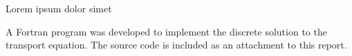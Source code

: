 \documentclass[../main.tex]{subfiles}
\begin{document}
Lorem ipsum dolor simet

A Fortran program was developed to implement the discrete solution to the transport equation. The source code is included as an attachment to this report. 


	
\end{document}
